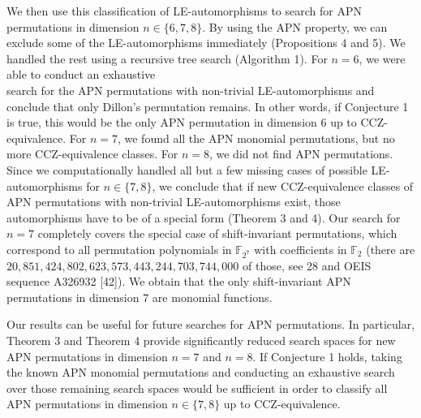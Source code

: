 \documentclass[10pt]{article}
\begin{document}
We then use this classification of LE-automorphisms to search for APN permutations in dimension $n \in\{6,7,8\}$. By using the APN property, we can exclude some of the LE-automorphisms immediately (Propositions 4 and 5). We handled the rest using a recursive tree search (Algorithm 1). For $n=6$, we were able to conduct an exhaustive\\
search for the APN permutations with non-trivial LE-automorphisms and conclude that only Dillon's permutation remains. In other words, if Conjecture 1 is true, this would be the only APN permutation in dimension 6 up to CCZ-equivalence. For $n=7$, we found all the APN monomial permutations, but no more CCZ-equivalence classes. For $n=8$, we did not find APN permutations. Since we computationally handled all but a few missing cases of possible LE-automorphisms for $n \in\{7,8\}$, we conclude that if new CCZ-equivalence classes of APN permutations with non-trivial LE-automorphisms exist, those automorphisms have to be of a special form (Theorem 3 and 4). Our search for $n=7$ completely covers the special case of shift-invariant permutations, which correspond to all permutation polynomials in $\mathbb{F}_{2^{7}}$ with coefficients in $\mathbb{F}_{2}$ (there are $20,851,424,802,623,573,443,244,703,744,000$ of those, see 28 and OEIS sequence A326932 [42]). We obtain that the only shift-invariant APN permutations in dimension 7 are monomial functions.

Our results can be useful for future searches for APN permutations. In particular, Theorem 3 and Theorem 4 provide significantly reduced search spaces for new APN permutations in dimension $n=7$ and $n=8$. If Conjecture 1 holds, taking the known APN monomial permutations and conducting an exhaustive search over those remaining search spaces would be sufficient in order to classify all APN permutations in dimension $n \in\{7,8\}$ up to CCZ-equivalence.
\end{document}
